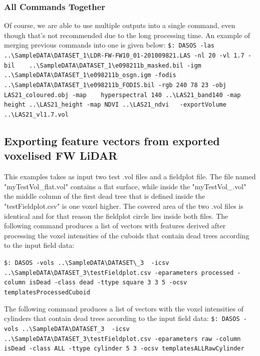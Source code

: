 \documentclass{subfiles}
\begin{document}
	    \subsubsection{All Commands Together}
	    \par Of course, we are able to use multiple outputs into a single command, even though that's not recommended due to the long processing time. An example of merging previous commands into one is given below:\newline
	    \verb|$: DASOS -las ..\SampleDATA\DATASET_1\LDR-FW-FW10_01-201009821.LAS -nl 20 |\newline \verb|-vl 1.7 -bil    ..\SampleDATA\DATASET_1\e098211b_masked.bil -igm  |\newline \verb|   ..\SampleDATA\DATASET_1\e098211b_osgn.igm -fodis |\newline \verb|   ..\SampleDATA\DATASET_1\e098211b_FODIS.bil -rgb 240 78 23 -obj|\newline \verb| LAS21_coloured.obj -map |\newline \verb|   hyperspectral 140 ..\LAS21_band140 -map  height ..\LAS21_height -map|\newline \verb| NDVI ..\LAS21_ndvi   -exportVolume ..\LAS21_vl1.7.vol|\newline
	    
	    \subsection{Exporting feature vectors from exported voxelised FW LiDAR}
	    \par This examples takes as input two test .vol files and a fieldplot file. The file named "myTestVol\_flat.vol" contains a flat surface, while inside the "myTestVol\_.vol" the middle column of the first dead tree that is defined inside the "testFieldplot.csv" is one voxel higher. The covered area of the two .vol files is identical and for that reason the fieldplot circle lies inside both files. The following command produces a list of vectors with features derived after processing the voxel intensities of the cuboids that contain dead trees according to the input field data:

	   \verb|$: DASOS -vols ..\SampleDATA\DATASET\_3  -icsv |\newline \verb|..\SampleDATA\DATASET_3\testFieldplot.csv -eparameters processed -column |\newline \verb|isDead -class dead -ttype square 3 3 5 -ocsv templatesProcessedCuboid |
	   \newline
	   \par The following command produces a list of vectors with the voxel intensities of cylinders that contain dead trees according to the input field data: \newline
	   \verb|$: DASOS -vols ..\SampleDATA\DATASET_3  -icsv |\newline \verb|..\SampleDATA\DATASET_3\testFieldplot.csv -eparameters raw -column|\newline \verb| isDead -class ALL -ttype cylinder 5 3 -ocsv templatesALLRawCylinder|
	   
\end{document}
